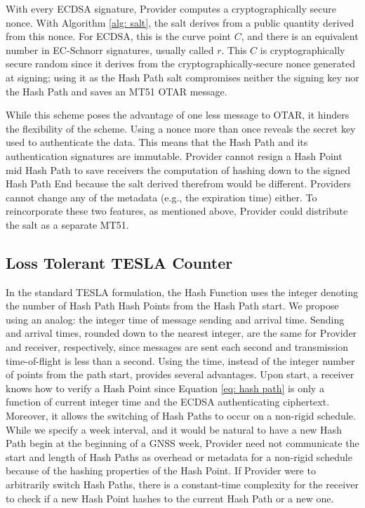 \documentclass[letterpaper,times]{IONconf/IONconf}
\begin{document}
With every ECDSA signature, Provider computes a cryptographically secure nonce.
With Algorithm \ref{alg: salt}, the salt derives from a public quantity derived from this nonce.
For ECDSA, this is the curve point $C$, and there is an equivalent number in EC-Schnorr signatures, usually called $r$.
This $C$ is cryptographically secure random since it derives from the cryptographically-secure nonce generated at signing; using it as the Hash Path salt compromises neither the signing key nor the Hash Path and saves an MT51 OTAR message.

While this scheme poses the advantage of one less message to OTAR, it hinders the flexibility of the scheme.
Using a nonce more than once reveals the secret key used to authenticate the data.
This means that the Hash Path and its authentication signatures are immutable.
Provider cannot resign a Hash Point mid Hash Path to save receivers the computation of hashing down to the signed Hash Path End because the salt derived therefrom would be different.
Providers cannot change any of the metadata (e.g., the expiration time) either.
To reincorporate these two features, as mentioned above, Provider could distribute the salt as a separate MT51.

\subsection{Loss Tolerant TESLA Counter} \label{sec: alert salt}

In the standard TESLA formulation, the Hash Function uses the integer denoting the number of Hash Path Hash Points from the Hash Path start.
We propose using an analog: the integer time of message sending and arrival time.
Sending and arrival times, rounded down to the nearest integer, are the same for Provider and receiver, respectively, since messages are sent each second and transmission time-of-flight is less than a second.
Using the time, instead of the integer number of points from the path start, provides several advantages.
Upon start, a receiver knows how to verify a Hash Point since Equation \eqref{eq: hash path} is only a function of current integer time and the ECDSA authenticating ciphertext.
Moreover, it allows the switching of Hash Paths to occur on a non-rigid schedule.
While we specify a week interval, and it would be natural to have a new Hash Path begin at the beginning of a GNSS week, Provider need not communicate the start and length of Hash Paths as overhead or metadata for a non-rigid schedule because of the hashing properties of the Hash Point.
If Provider were to arbitrarily switch Hash Paths, there is a constant-time complexity for the receiver to check if a new Hash Point hashes to the current Hash Path or a new one.
\end{document}
